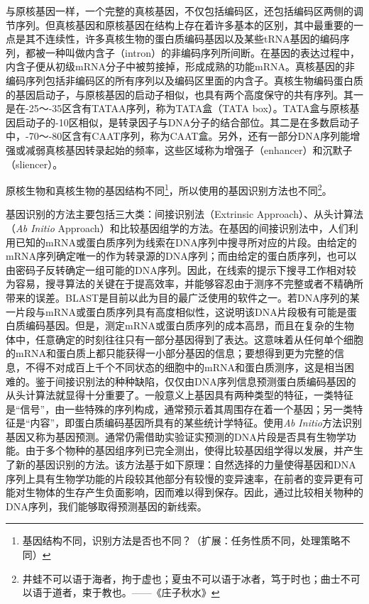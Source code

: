 \documentclass[11pt,a4paper,twoside]{book}
\begin{document}
与原核基因一样，一个完整的真核基因，不仅包括编码区，还包括编码区两侧的调节序列。但真核基因和原核基因在结构上存在着许多基本的区别，其中最重要的一点是其不连续性，许多真核生物的蛋白质编码基因以及某些tRNA基因的编码序列，都被一种叫做内含子（intron）的非编码序列所间断。在基因的表达过程中，内含子便从初级mRNA分子中被剪接掉，形成成熟的功能mRNA。真核基因的非编码序列包括非编码区的所有序列以及编码区里面的内含子。真核生物编码蛋白质的基因启动子，与原核基因的启动子相似，也具有两个高度保守的共有序列。其一是在-25～-35区含有TATAA序列，称为TATA盒（TATA box）。TATA盒与原核基因启动子的-10区相似，是转录因子与DNA分子的结合部位。其二是在多数启动子中，-70～-80区含有CAAT序列，称为CAAT盒。另外，还有一部分DNA序列能增强或减弱真核基因转录起始的频率，这些区域称为增强子（enhancer）和沉默子（sliencer）。

原核生物和真核生物的基因结构不同\footnote{基因结构不同，识别方法是否也不同？（扩展：任务性质不同，处理策略不同）}，所以使用的基因识别方法也不同\footnote{井蛙不可以语于海者，拘于虚也；夏虫不可以语于冰者，笃于时也；曲士不可以语于道者，束于教也。——《庄子\textbullet 秋水》}。

基因识别的方法主要包括三大类：间接识别法（Extrinsic Approach）、从头计算法（\textit{Ab Initio} Approach）和比较基因组学的方法。在基因的间接识别法中，人们利用已知的mRNA或蛋白质序列为线索在DNA序列中搜寻所对应的片段。由给定的mRNA序列确定唯一的作为转录源的DNA序列；而由给定的蛋白质序列，也可以由密码子反转确定一组可能的DNA序列。因此，在线索的提示下搜寻工作相对较为容易，搜寻算法的关键在于提高效率，并能够容忍由于测序不完整或者不精确所带来的误差。BLAST是目前以此为目的最广泛使用的软件之一。若DNA序列的某一片段与mRNA或蛋白质序列具有高度相似性，这说明该DNA片段极有可能是蛋白质编码基因。但是，测定mRNA或蛋白质序列的成本高昂，而且在复杂的生物体中，任意确定的时刻往往只有一部分基因得到了表达。这意味着从任何单个细胞的mRNA和蛋白质上都只能获得一小部分基因的信息；要想得到更为完整的信息，不得不对成百上千个不同状态的细胞中的mRNA和蛋白质测序，这是相当困难的。鉴于间接识别法的种种缺陷，仅仅由DNA序列信息预测蛋白质编码基因的从头计算法就显得十分重要了。一般意义上基因具有两种类型的特征，一类特征是“信号”，由一些特殊的序列构成，通常预示着其周围存在着一个基因；另一类特征是“内容”，即蛋白质编码基因所具有的某些统计学特征。使用\textit{Ab Initio}方法识别基因又称为基因预测。通常仍需借助实验证实预测的DNA片段是否具有生物学功能。由于多个物种的基因组序列已完全测出，使得比较基因组学得以发展，并产生了新的基因识别的方法。该方法基于如下原理：自然选择的力量使得基因和DNA序列上具有生物学功能的片段较其他部分有较慢的变异速率，在前者的变异更有可能对生物体的生存产生负面影响，因而难以得到保存。因此，通过比较相关物种的DNA序列，我们能够取得预测基因的新线索。
\end{document}
